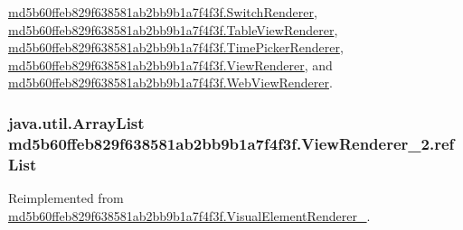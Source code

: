 \hyperlink{classmd5b60ffeb829f638581ab2bb9b1a7f4f3f_1_1_switch_renderer_5d8d51148704e49b135709f942738f92}{md5b60ffeb829f638581ab2bb9b1a7f4f3f.SwitchRenderer}, \hyperlink{classmd5b60ffeb829f638581ab2bb9b1a7f4f3f_1_1_table_view_renderer_bfca855cef125ff9e66a6690bfef09b8}{md5b60ffeb829f638581ab2bb9b1a7f4f3f.TableViewRenderer}, \hyperlink{classmd5b60ffeb829f638581ab2bb9b1a7f4f3f_1_1_time_picker_renderer_3c77da783a54f125d97047436f80a34c}{md5b60ffeb829f638581ab2bb9b1a7f4f3f.TimePickerRenderer}, \hyperlink{classmd5b60ffeb829f638581ab2bb9b1a7f4f3f_1_1_view_renderer_9d61e0ff54f2c1a789912ef2d2e97d9d}{md5b60ffeb829f638581ab2bb9b1a7f4f3f.ViewRenderer}, and \hyperlink{classmd5b60ffeb829f638581ab2bb9b1a7f4f3f_1_1_web_view_renderer_023fa86f93ecfb325971c3a7204ebc7e}{md5b60ffeb829f638581ab2bb9b1a7f4f3f.WebViewRenderer}.\hypertarget{classmd5b60ffeb829f638581ab2bb9b1a7f4f3f_1_1_view_renderer__2_6c151401977148a92c515e9c7de1aaf8}{
\subsubsection[{refList}]{\setlength{\rightskip}{0pt plus 5cm}java.util.ArrayList {\bf md5b60ffeb829f638581ab2bb9b1a7f4f3f.ViewRenderer\_\-2.refList}}}
\label{classmd5b60ffeb829f638581ab2bb9b1a7f4f3f_1_1_view_renderer__2_6c151401977148a92c515e9c7de1aaf8}




Reimplemented from \hyperlink{classmd5b60ffeb829f638581ab2bb9b1a7f4f3f_1_1_visual_element_renderer__1_4ebd0e42ebd360712eb189930036fc9f}{md5b60ffeb829f638581ab2bb9b1a7f4f3f.VisualElementRenderer\_}.

